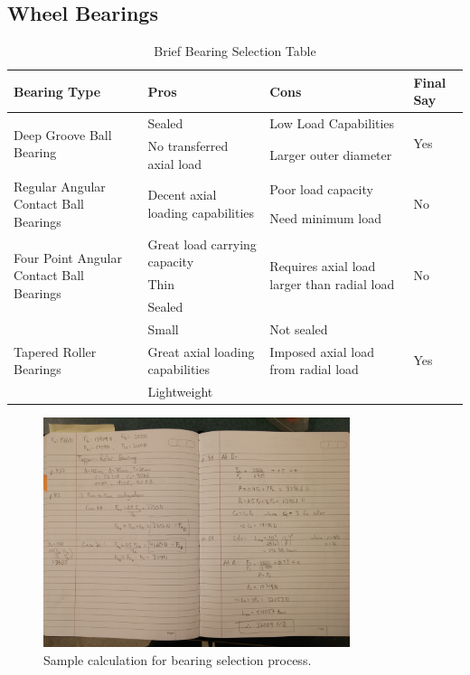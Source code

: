 \subsection{Wheel Bearings}\label{sec:ws_bearing}

\begin{table}[htbp]
	\centering
	\caption{Brief Bearing Selection Table}
	\begin{tabular}{| p{4cm}p{4cm}p{4cm}l |} \hline
		Bearing Type & Pros & Cons & Final Say \\ \hline
		\multirow{2}{4cm}{Deep Groove Ball Bearing} & Sealed & Low Load Capabilities & \multirow{2}{*}{Yes} \\
		& No transferred axial load & Larger outer diameter & \\ \hline
		\multirow{2}{4cm}{Regular Angular Contact Ball Bearings} & \multirow{2}{4cm}{Decent axial loading capabilities} & Poor load capacity & \multirow{2}{*}{No} \\
		& & Need minimum load & \\ \hline
		\multirow{3}{4cm}{Four Point Angular Contact Ball Bearings} & Great load carrying capacity & \multirow{3}{4cm}{Requires axial load larger than radial load} & \multirow{3}{*}{No} \\
		& Thin & & \\
		& Sealed & & \\ \hline
		\multirow{3}{4cm}{Tapered Roller Bearings} & Small & Not sealed & \multirow{3}{*}{Yes} \\
		& Great axial loading capabilities & Imposed axial load from radial load & \\
		& Lightweight & & \\ \hline
	\end{tabular}
	\label{tab:bearing_selection}
\end{table}

\begin{figure}[H]
	\centering
	\includegraphics[width=0.8\textwidth]{dom/bearing_selection_calc.jpg}
	\caption{Sample calculation for bearing selection process.}
	\label{fig:bearing_calc}
\end{figure}

